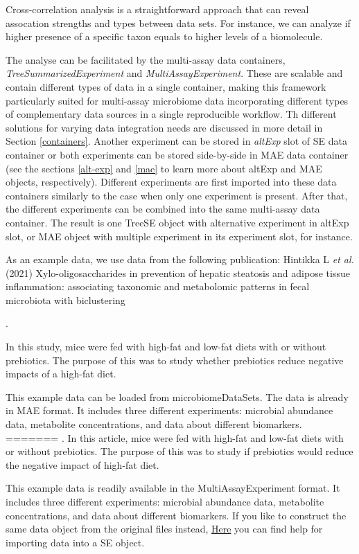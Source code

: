 \documentclass[
]{book}
\begin{document}
Cross-correlation analysis is a straightforward approach that can
reveal assocation strengths and types between data sets. For instance,
we can analyze if higher presence of a specific taxon equals to higher
levels of a biomolecule.

The analyse can be facilitated by the multi-assay data containers,
\emph{TreeSummarizedExperiment} and \emph{MultiAssayExperiment}. These are
scalable and contain different types of data in a single container,
making this framework particularly suited for multi-assay microbiome
data incorporating different types of complementary data sources in a
single reproducible workflow. Th different solutions for varying data
integration needs are discussed in more detail in Section
\ref{containers}. Another experiment can be stored in \emph{altExp} slot
of SE data container or both experiments can be stored side-by-side in
MAE data container (see the sections \ref{alt-exp} and \ref{mae} to
learn more about altExp and MAE objects, respectively). Different
experiments are first imported into these data containers similarly to
the case when only one experiment is present. After that, the
different experiments can be combined into the same multi-assay data
container. The result is one TreeSE object with alternative experiment in
altExp slot, or MAE object with multiple experiment in its experiment
slot, for instance.

As an example data, we use data from the following publication: Hintikka L
\emph{et al.} (2021) Xylo-oligosaccharides in prevention of hepatic
steatosis and adipose tissue inflammation: associating taxonomic and
metabolomic patterns in fecal microbiota with biclustering

\citep{Hintikka2021}.

In this study, mice were fed with high-fat and low-fat diets with or
without prebiotics. The purpose of this was to study whether prebiotics
reduce negative impacts of a high-fat diet.

This example data can be loaded from microbiomeDataSets. The data is
already in MAE format. It includes three different experiments:
microbial abundance data, metabolite concentrations, and data about
different biomarkers.
=======
\citep{Hintikka2021}. In this article, mice were fed with high-fat and
low-fat diets with or without prebiotics. The purpose of this was to
study if prebiotics would reduce the negative impact of high-fat diet.

This example data is readily available in the MultiAssayExperiment
format. It includes three different experiments: microbial abundance
data, metabolite concentrations, and data about different
biomarkers. If you like to construct the same data object from the
original files instead, \href{https://microbiome.github.io/OMA/containers.html\#loading-experimental-microbiome-data}{Here}
you can find help for importing data into a SE object.
\end{document}
